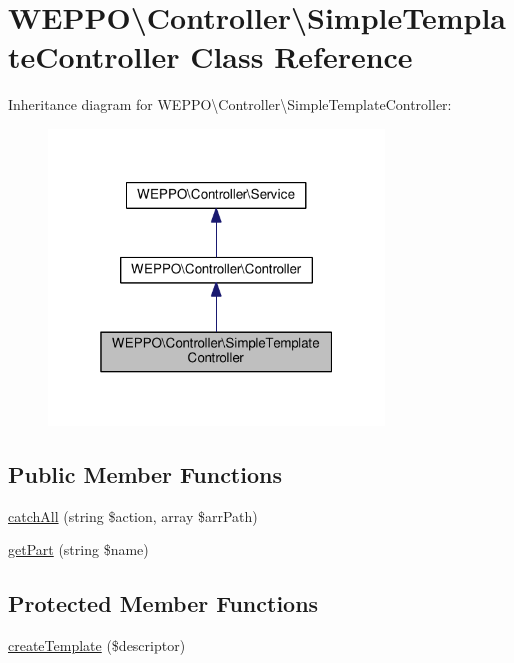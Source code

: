 \hypertarget{classWEPPO_1_1Controller_1_1SimpleTemplateController}{}\section{W\+E\+P\+PO\textbackslash{}Controller\textbackslash{}Simple\+Template\+Controller Class Reference}
\label{classWEPPO_1_1Controller_1_1SimpleTemplateController}


Inheritance diagram for W\+E\+P\+PO\textbackslash{}Controller\textbackslash{}Simple\+Template\+Controller\+:\nopagebreak
\begin{figure}[H]
\begin{center}
\leavevmode
\includegraphics[width=253pt]{classWEPPO_1_1Controller_1_1SimpleTemplateController__inherit__graph}
\end{center}
\end{figure}
\subsection*{Public Member Functions}
\begin{DoxyCompactItemize}
\item 
\hyperlink{classWEPPO_1_1Controller_1_1SimpleTemplateController_a404447bf22f06c958fdfffa389a2fc05}{catch\+All} (string \$action, array \$arr\+Path)
\item 
\hyperlink{classWEPPO_1_1Controller_1_1SimpleTemplateController_a7536a53472021044ff90b4ef3a9555fe}{get\+Part} (string \$name)
\end{DoxyCompactItemize}
\subsection*{Protected Member Functions}
\begin{DoxyCompactItemize}
\item 
\hyperlink{classWEPPO_1_1Controller_1_1SimpleTemplateController_a7aa8a7c6ade0c50c738149df4f51aadb}{create\+Template} (\$descriptor)
\end{DoxyCompactItemize}

